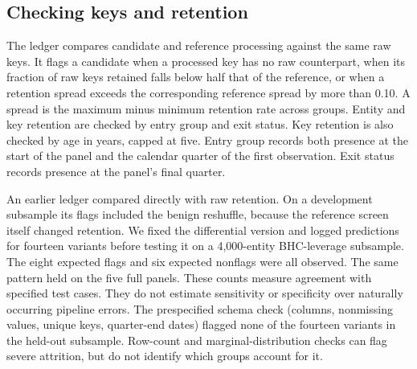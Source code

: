 \documentclass[linenumber]{jdsart}
\begin{document}
\subsection{Checking keys and retention}
The ledger compares candidate and reference processing against the same raw keys. It flags a candidate when a processed key has no raw counterpart, when its fraction of raw keys retained falls below half that of the reference, or when a retention spread exceeds the corresponding reference spread by more than 0.10. A spread is the maximum minus minimum retention rate across groups. Entity and key retention are checked by entry group and exit status. Key retention is also checked by age in years, capped at five. Entry group records both presence at the start of the panel and the calendar quarter of the first observation. Exit status records presence at the panel's final quarter.

An earlier ledger compared directly with raw retention. On a development subsample its flags included the benign reshuffle, because the reference screen itself changed retention. We fixed the differential version and logged predictions for fourteen variants before testing it on a 4,000-entity BHC-leverage subsample. The eight expected flags and six expected nonflags were all observed. The same pattern held on the five full panels. These counts measure agreement with specified test cases. They do not estimate sensitivity or specificity over naturally occurring pipeline errors. The prespecified schema check (columns, nonmissing values, unique keys, quarter-end dates) flagged none of the fourteen variants in the held-out subsample. Row-count and marginal-distribution checks can flag severe attrition, but do not identify which groups account for it.
\end{document}
